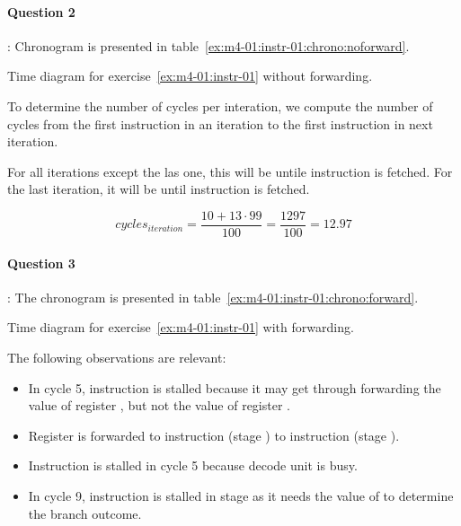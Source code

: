 \paragraph{Question 2}: Chronogram is presented in table~\ref{ex:m4-01:instr-01:chrono:noforward}.

\begin{table}[htb]

\caption{Time diagram for exercise~\ref{ex:m4-01:instr-01} without forwarding.}
\label{ex:m4-01:instr-01:chrono:noforward}
\end{table}

To determine the number of cycles per interation, we compute the number of cycles
from the first instruction in an iteration to the first instruction in next iteration.

For all iterations except the las one, this will be untile instruction 
is fetched. For the last iteration, it will be until instruction  
is fetched.

\[
cycles_{iteration} = \frac{10 + 13 \cdot 99}{100} = \frac{1297}{100} = 12.97
\]

\paragraph{Question 3}: 
The chronogram is presented in table~\ref{ex:m4-01:instr-01:chrono:forward}.

\begin{table}[htb]

\caption{Time diagram for exercise~\ref{ex:m4-01:instr-01} with forwarding.}
\label{ex:m4-01:instr-01:chrono:forward}
\end{table}

The following observations are relevant:
\begin{itemize}

\item In cycle 5, instruction  is stalled because
      it may get through forwarding the value of register ,
      but not the value of register .

\item Register  is forwarded to instruction 
      (stage ) to instruction  (stage ).

\item Instruction  is stalled in cycle 5
      because decode unit is busy.

\item In cycle 9, instruction  is stalled
      in stage  as it needs the value of 
      to determine the branch outcome.

\end{itemize}


